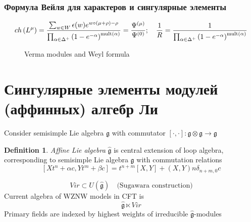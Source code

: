 \documentclass[pdftex]{beamer}
\newcommand{\gf}{\mathfrak{g}}
\newcommand{\gfh}{\hat{\mathfrak{g}}}
\theoremstyle{definition} \newtheorem{Def}{Definition}
\begin{document}
\begin{frame}
  \frametitle{Формула Вейля для характеров и сингулярные элементы}
  
\begin{equation*}
    ch\left( L^{\mu }\right) =\frac{\sum_{w\in W}\epsilon (w)e^{w\circ (\mu
        +\rho )-\rho }}{\prod_{\alpha \in \Delta ^{+}}\left( 1-e^{-\alpha }\right) ^{%
        \mathrm{{mult}\left( \alpha \right) }}}=\frac{\Psi ^{\left( \mu \right) }}{%
      \Psi ^{\left( 0\right) }};\quad
    \frac{1}{R}=\frac{1}{\prod_{\alpha \in \Delta ^{+}}\left( 1-e^{-\alpha }\right) ^{\mathrm{{%
          mult}\left( \alpha \right) }}}
  \end{equation*}
  \begin{figure}
    \centering
    \caption{Verma modules and Weyl formula}
    \label{fig:verma}
  \end{figure}
\end{frame}

\section{Сингулярные элементы модулей (аффинных) алгебр Ли}


  Consider semisimple Lie algebra $\gf$ with commutator $[\cdot,\cdot]:\gf\otimes\gf\to \gf$
  \begin{Def}
    {\it Affine Lie algebra} $\gfh$ is central extension of loop algebra, corresponding to semisimple Lie algebra $\gf$ with commutation relations
    \begin{equation*}
      \label{eq:7}
      [X t^{n}+\alpha c,Y t^{m}+\beta c]=t^{n+m} [X,Y]+(X,Y)n\delta_{n+m,0}c
    \end{equation*}
  \end{Def}
  \begin{equation*}
      Vir \subset U(\gfh) \quad \text{(Sugawara construction)}
  \end{equation*}
  Current algebra of WZNW models in CFT is
  \begin{equation*}
    \gfh \ltimes Vir
  \end{equation*}
  Primary fields are indexed by highest weights of irreducible $\gfh$-modules
\end{document}
